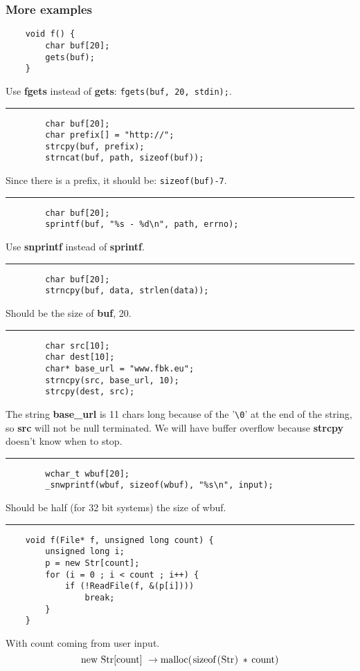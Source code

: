 \documentclass[a4paper, 10pt, titlepage]{article}
\begin{document}
\subsubsection*{More examples}
\begin{lstlisting}
	void f() {
		char buf[20];
		gets(buf);
	}
\end{lstlisting}
Use \textbf{fgets} instead of \textbf{gets}: \lstinline|fgets(buf, 20, stdin);|.
\\\noindent\rule{10cm}{0.4pt}
\begin{lstlisting}
		char buf[20];
		char prefix[] = "http://";
		strcpy(buf, prefix);
		strncat(buf, path, sizeof(buf));
\end{lstlisting}
Since there is a prefix, it should be: \lstinline|sizeof(buf)-7|.
\\\noindent\rule{10cm}{0.4pt}
\begin{lstlisting}
		char buf[20];
		sprintf(buf, "%s - %d\n", path, errno);
\end{lstlisting}
Use \textbf{snprintf} instead of \textbf{sprintf}.
\\\noindent\rule{10cm}{0.4pt}
\begin{lstlisting}
		char buf[20];
		strncpy(buf, data, strlen(data));
\end{lstlisting}
Should be the size of \textbf{buf}, 20.
\\\noindent\rule{10cm}{0.4pt}
\begin{lstlisting}
		char src[10];
		char dest[10];
		char* base_url = "www.fbk.eu";
		strncpy(src, base_url, 10);
		strcpy(dest, src);
\end{lstlisting}
The string \textbf{base\_url} is 11 chars long because of the '\lstinline|\0|' at the end of the string, so \textbf{src} will not be null terminated. We will have buffer overflow because \textbf{strcpy} doesn’t know when to stop.
\\\noindent\rule{10cm}{0.4pt}
\begin{lstlisting}
		wchar_t wbuf[20];
		_snwprintf(wbuf, sizeof(wbuf), "%s\n", input);
\end{lstlisting}
Should be half (for 32 bit systems) the size of wbuf.
\\\noindent\rule{10cm}{0.4pt}
\begin{lstlisting}
	void f(File* f, unsigned long count) {
		unsigned long i;
		p = new Str[count];
		for (i = 0 ; i < count ; i++) {
			if (!ReadFile(f, &(p[i])))
				break;
		}
	}
\end{lstlisting}
With count coming from user input. 
$$\text{\lstinline|new Str[count]| }\rightarrow \text{\lstinline|malloc(sizeof(Str) * count)|}$$
\end{document}
